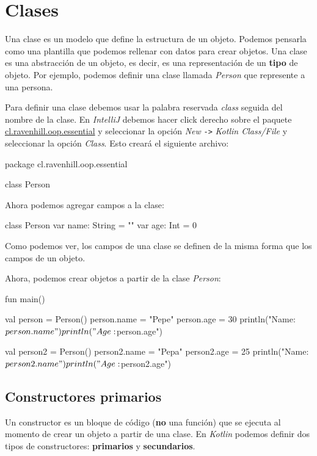 \section{Clases}
  Una clase es un modelo que define la estructura de un objeto.
  Podemos pensarla como una plantilla que podemos rellenar con datos para crear objetos.
  Una clase es una abstracción de un objeto, es decir, es una representación de un \textbf{tipo} de
  objeto.
  Por ejemplo, podemos definir una clase llamada \textit{Person} que represente a una persona.

  Para definir una clase debemos usar la palabra reservada \textit{class} seguida del nombre de la
  clase.
  En \textit{IntelliJ} debemos hacer click derecho sobre el paquete \url{cl.ravenhill.oop.essential}
  y seleccionar la opción \textit{New} \texttt{->} \textit{Kotlin Class/File} y seleccionar la 
  opción \textit{Class}.
  Esto creará el siguiente archivo:

  \begin{kotlin}
    package cl.ravenhill.oop.essential

    class Person {
    }
  \end{kotlin}

  Ahora podemos agregar campos a la clase:

  \begin{kotlin}
    class Person {
      var name: String = ""
      var age: Int = 0
    }
  \end{kotlin}

  Como podemos ver, los campos de una clase se definen de la misma forma que los campos de un 
  objeto.

  Ahora, podemos crear objetos a partir de la clase \textit{Person}:

  \begin{kotlin}
    fun main() {
      val person = Person()
      person.name = "Pepe"
      person.age = 30
      println("Name: ${person.name}")
      println("Age: ${person.age}")
      
      val person2 = Person()
      person2.name = "Pepa"
      person2.age = 25
      println("Name: ${person2.name}")
      println("Age: ${person2.age}")
    }
  \end{kotlin}

  \subsection{Constructores primarios}
    Un constructor es un bloque de código (\textbf{no} una función) que se ejecuta al momento de 
    crear un objeto a partir de una clase.
    En \textit{Kotlin} podemos definir dos tipos de constructores: \textbf{primarios} y
    \textbf{secundarios}.

